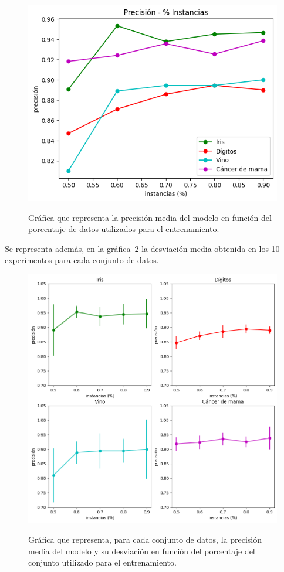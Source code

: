 \begin{figure}[h]
	\caption{Gráfica que representa la precisión media del modelo en función del porcentaje de datos utilizados para el entrenamiento.}
	\centering
	\includegraphics[width=\textwidth]{../img/memoria/5_precision-porcentaje_entrenamiento}
	\label{5_precision-porcentaje_entrenamiento}
\end{figure}
\par

Se representa además, en la gráfica~\ref{5_precision-porcentaje_entrenamiento_individual} la desviación media obtenida en los 10 experimentos para cada conjunto de datos.

\begin{figure}[h]
	\caption{Gráfica que representa, para cada conjunto de datos, la precisión media del modelo y su desviación en función del porcentaje del conjunto utilizado para el entrenamiento.}
	\centering
	\includegraphics[width=\textwidth]{../img/memoria/5_precision-porcentaje_entrenamiento_individual}
	\label{5_precision-porcentaje_entrenamiento_individual}
\end{figure}
\par

